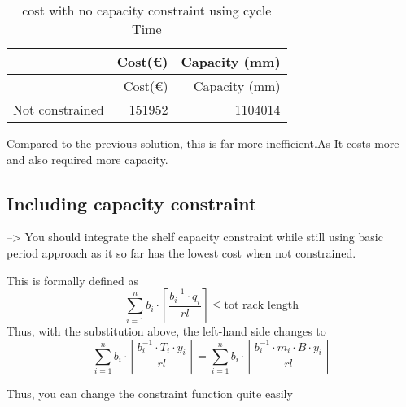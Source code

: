 \documentclass[
]{article}
\newenvironment{Shaded}{\begin{snugshade}}{\end{snugshade}}
\newcommand{\CommentTok}[1]{\textcolor[rgb]{0.56,0.35,0.01}{\textit{#1}}}
\begin{document}
\begin{longtable}[]{@{}lrr@{}}
\caption{cost with no capacity constraint using cycle
Time}\tabularnewline
\toprule
& Cost(€) & Capacity (mm)\tabularnewline
\midrule
\endfirsthead
\toprule
& Cost(€) & Capacity (mm)\tabularnewline
\midrule
\endhead
Not constrained & 151952 & 1104014\tabularnewline
\bottomrule
\end{longtable}

Compared to the previous solution, this is far more inefficient.As It
costs more and also required more capacity.

\begin{Shaded}
\end{Shaded}

\hypertarget{including-capacity-constraint}{%
\subsection{Including capacity
constraint}\label{including-capacity-constraint}}

--\textgreater{} You should integrate the shelf capacity constraint
while still using basic period approach as it so far has the lowest cost
when not constrained.

This is formally defined as
\[ \sum_{i=1}^n b_i \cdot \left\lceil\frac{b^{-1}_i \cdot q_i}{rl} \right \rceil \leq \text{tot_rack_length}\]
Thus, with the substitution above, the left-hand side changes to
\[ \sum_{i=1}^n b_i \cdot \left\lceil\frac{b^{-1}_i \cdot T_i \cdot y_i}{rl} \right \rceil = \sum_{i=1}^n b_i \cdot \left\lceil\frac{b^{-1}_i \cdot m_i \cdot B \cdot y_i}{rl} \right \rceil\]

Thus, you can change the constraint function quite easily
\end{document}
